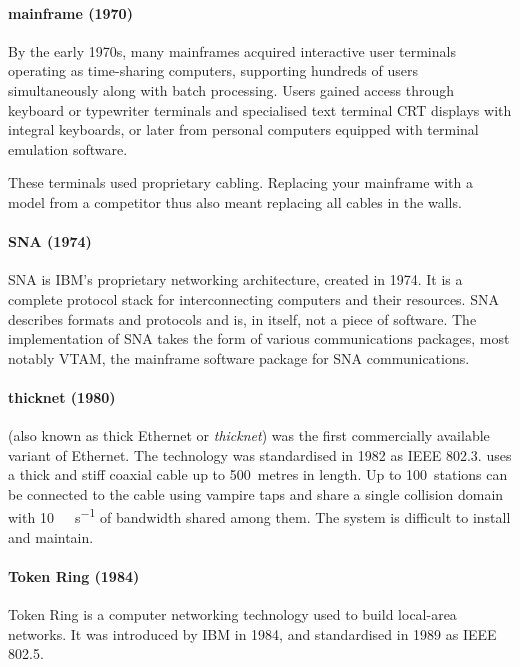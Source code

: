 {\paragraph{mainframe (1970)}
By the early 1970s, many mainframes acquired interactive user terminals operating as time-sharing computers, supporting hundreds of users simultaneously along with batch processing.
Users gained access through keyboard or typewriter terminals and specialised text terminal \gls{CRT} displays with integral keyboards, or later from personal computers equipped with terminal emulation software.

These terminals used proprietary cabling.
Replacing your mainframe with a model from a competitor thus also meant replacing all cables in the walls.
    
\paragraph{\acl{SNA} (1974)}
\Gls{SNA} is IBM's proprietary networking architecture, created in 1974.
It is a complete protocol stack for interconnecting computers and their resources.
\gls{SNA} describes formats and protocols and is, in itself, not a piece of software.
The implementation of \gls{SNA} takes the form of various communications packages, most notably \gls{VTAM}, the mainframe software package for \gls{SNA} communications.
    
\paragraph{thicknet (1980)}
 (also known as thick Ethernet or \emph{thicknet}) was the first commercially available variant of Ethernet.
The technology was standardised in 1982 as \acs{IEEE} 802.3.
 uses a thick and stiff coaxial cable up to 500~metres in length.
Up to 100~stations can be connected to the cable using vampire taps and share a single collision domain with \SI{10}{\mega\bit\per\second} of bandwidth shared among them.
The system is difficult to install and maintain.

\paragraph{Token Ring (1984)}
Token Ring is a computer networking technology used to build local-area networks.
It was introduced by IBM in 1984, and standardised in 1989 as \acs{IEEE} 802.5.

}
